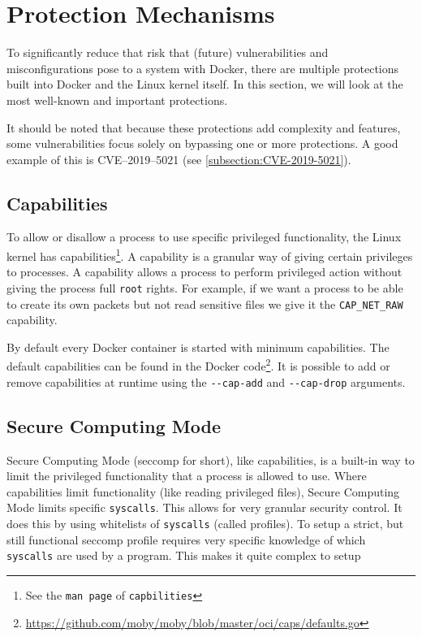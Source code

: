 \section{Protection Mechanisms}

To significantly reduce that risk that (future) vulnerabilities and misconfigurations pose to a system with Docker, there are multiple protections built into Docker and the Linux kernel itself. In this section, we will look at the most well-known and important protections.

\hfill

It should be noted that because these protections add complexity and features, some vulnerabilities focus solely on bypassing one or more protections. A good example of this is CVE--2019--5021 (see \autoref{subsection:CVE-2019-5021}).

\subsection{Capabilities}\label{subsection:capabilities}
To allow or disallow a process to use specific privileged functionality, the Linux kernel has capabilities\footnote{See the \lstinline{man page} of \lstinline{capbilities}}. A capability is a granular way of giving certain privileges to processes. A capability allows a process to perform privileged action without giving the process full \lstinline{root} rights. For example, if we want a process to be able to create its own packets but not read sensitive files we give it the \lstinline{CAP_NET_RAW} capability.

\hfill

By default every Docker container is started with minimum capabilities. The default capabilities can be found in the Docker code\footnote{\url{https://github.com/moby/moby/blob/master/oci/caps/defaults.go}}. It is possible to add or remove capabilities at runtime using the \lstinline{--cap-add} and \lstinline{--cap-drop}\cite{More-Secure-Non-Root-Container} arguments.

\subsection{Secure Computing Mode}
Secure Computing Mode (seccomp for short), like capabilities, is a built-in way to limit the privileged functionality that a process is allowed to use. Where capabilities limit functionality (like reading privileged files), Secure Computing Mode limits specific \lstinline{syscalls}. This allows for very granular security control. It does this by using whitelists of \lstinline{syscalls} (called profiles).
To setup a strict, but still functional seccomp profile requires very specific knowledge of which \lstinline{syscalls} are used by a program. This makes it quite complex to setup

